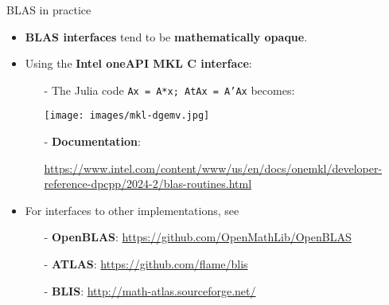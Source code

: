 \documentclass[t,usepdftitle=false]{beamer}
\begin{document}
\begin{frame}{BLAS in practice}
\begin{itemize}
\item \textbf{BLAS interfaces} tend to be \textbf{mathematically opaque}.
\item Using the \textbf{Intel oneAPI MKL C interface}:
\begin{itemize}\normalsize
\item[-] The Julia code \texttt{Ax = A*x; AtAx = A'Ax} becomes:\vspace{.1cm}
\begin{center}
\texttt{[image: images/mkl-dgemv.jpg]}
\end{center}
\item[-] \textbf{Documentation}:\\
\begin{center}\normalsize
\url{https://www.intel.com/content/www/us/en/docs/onemkl/developer-reference-dpcpp/2024-2/blas-routines.html}
\end{center}
\end{itemize}
\item For interfaces to other implementations, see
\begin{itemize}\normalsize
\item[-] \textbf{OpenBLAS}: \url{https://github.com/OpenMathLib/OpenBLAS}\vspace{.1cm}
\item[-] \textbf{ATLAS}: \url{https://github.com/flame/blis}\vspace{.1cm}
\item[-] \textbf{BLIS}: \url{http://math-atlas.sourceforge.net/}
\end{itemize}
\end{itemize}
\end{frame}
\end{document}
